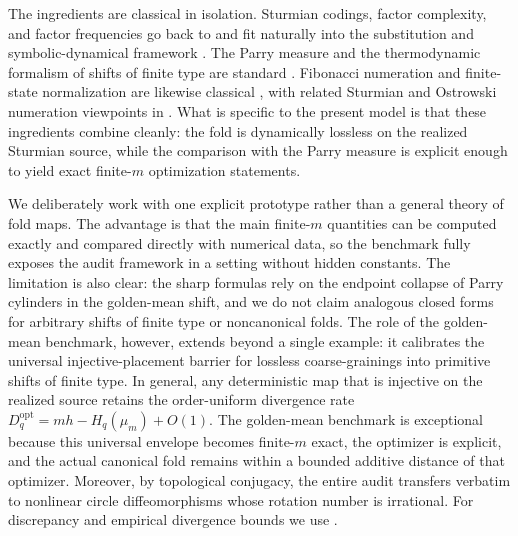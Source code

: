 \documentclass[11pt,letterpaper]{article}
\numberwithin{equation}{section}
\theoremstyle{plain}
\theoremstyle{definition}
\theoremstyle{remark}
\begin{document}
The ingredients are classical in isolation. Sturmian codings, factor
complexity, and factor frequencies go back to
\cite{MorseHedlund1940,Slater1950DistributionIntegers,Slater1967GapsSteps} and
fit naturally into the substitution and symbolic-dynamical framework
\cite{LindMarcus1995,QueffelecSubstitution,Fogg2002}. The Parry measure and the
thermodynamic formalism of shifts of finite type are standard
\cite{LindMarcus1995,WaltersErgodicTheory,ParryPollicott1990Zeta}. Fibonacci
numeration and finite-state normalization are likewise classical
\cite{Zeckendorf1972,Frougny1991FibonacciFiniteAutomata,Frougny1992NumbersAutomata},
with related Sturmian and Ostrowski numeration viewpoints in
\cite{Berthe2001Ostrowski,BaranwalaSchaefferShallit2021OstrowskiAutomatic}. What
is specific to the present model is that these ingredients combine cleanly:
the fold is dynamically lossless on the realized Sturmian source, while the
comparison with the Parry measure is explicit enough to yield exact
finite-\(m\) optimization statements.

We deliberately work with one explicit prototype rather than a general theory
of fold maps. The advantage is that the main finite-\(m\) quantities can be
computed exactly and compared directly with numerical data, so the benchmark
fully exposes the audit framework in a setting without hidden constants. The
limitation is also clear: the sharp formulas rely on the endpoint collapse of
Parry cylinders in the golden-mean shift, and we do not claim analogous closed
forms for arbitrary shifts of finite type or noncanonical folds. The role of
the golden-mean benchmark, however, extends beyond a single example: it
calibrates the universal injective-placement barrier for lossless
coarse-grainings into primitive shifts of finite type. In general, any
deterministic map that is injective on the realized source retains the
order-uniform divergence rate
\(D_q^{\mathrm{opt}}=mh - H_q(\mu_m)+O(1)\). The golden-mean benchmark is
exceptional because this universal envelope becomes finite-\(m\) exact, the
optimizer is explicit, and the actual canonical fold remains within a bounded
additive distance of that optimizer. Moreover, by topological conjugacy, the
entire audit transfers verbatim to nonlinear circle diffeomorphisms whose
rotation number is irrational.
For discrepancy and empirical divergence bounds we use
\cite{KuipersNiederreiter1974,Goda2024QuasiUniformKronecker,
WeissmanEtAl2003L1Empirical,SasonVerdu2016fDivergence,
DemboZeitouni2010LargeDeviations}.
\end{document}
